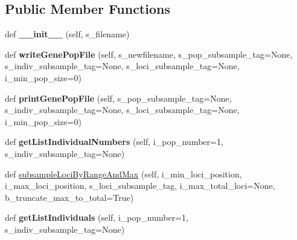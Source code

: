 \subsection*{Public Member Functions}
\begin{DoxyCompactItemize}
\item 
def {\bfseries \+\_\+\+\_\+init\+\_\+\+\_\+} (self, s\+\_\+filename)\hypertarget{classnegui_1_1genepopfilemanager_1_1GenepopFileManager_a8563b3299666d02d45c9acd64f450c51}{}\label{classnegui_1_1genepopfilemanager_1_1GenepopFileManager_a8563b3299666d02d45c9acd64f450c51}

\item 
def {\bfseries write\+Gene\+Pop\+File} (self, s\+\_\+newfilename, s\+\_\+pop\+\_\+subsample\+\_\+tag=None, s\+\_\+indiv\+\_\+subsample\+\_\+tag=None, s\+\_\+loci\+\_\+subsample\+\_\+tag=None, i\+\_\+min\+\_\+pop\+\_\+size=0)\hypertarget{classnegui_1_1genepopfilemanager_1_1GenepopFileManager_a7390cad5840454284e816679a87d84df}{}\label{classnegui_1_1genepopfilemanager_1_1GenepopFileManager_a7390cad5840454284e816679a87d84df}

\item 
def {\bfseries print\+Gene\+Pop\+File} (self, s\+\_\+pop\+\_\+subsample\+\_\+tag=None, s\+\_\+indiv\+\_\+subsample\+\_\+tag=None, s\+\_\+loci\+\_\+subsample\+\_\+tag=None, i\+\_\+min\+\_\+pop\+\_\+size=0)\hypertarget{classnegui_1_1genepopfilemanager_1_1GenepopFileManager_a35aa30c43ab4a5e7762bf8c722314727}{}\label{classnegui_1_1genepopfilemanager_1_1GenepopFileManager_a35aa30c43ab4a5e7762bf8c722314727}

\item 
def {\bfseries get\+List\+Individual\+Numbers} (self, i\+\_\+pop\+\_\+number=1, s\+\_\+indiv\+\_\+subsample\+\_\+tag=None)\hypertarget{classnegui_1_1genepopfilemanager_1_1GenepopFileManager_a652029f0a6e0668e0b75c9683dae0ffd}{}\label{classnegui_1_1genepopfilemanager_1_1GenepopFileManager_a652029f0a6e0668e0b75c9683dae0ffd}

\item 
def \hyperlink{classnegui_1_1genepopfilemanager_1_1GenepopFileManager_a4334a9164415aa05de38ac7b31d59e40}{subsample\+Loci\+By\+Range\+And\+Max} (self, i\+\_\+min\+\_\+loci\+\_\+position, i\+\_\+max\+\_\+loci\+\_\+position, s\+\_\+loci\+\_\+subsample\+\_\+tag, i\+\_\+max\+\_\+total\+\_\+loci=None, b\+\_\+truncate\+\_\+max\+\_\+to\+\_\+total=True)
\item 
def {\bfseries get\+List\+Individuals} (self, i\+\_\+pop\+\_\+number=1, s\+\_\+indiv\+\_\+subsample\+\_\+tag=None)\hypertarget{classnegui_1_1genepopfilemanager_1_1GenepopFileManager_aa6993dde24163002aeae55005437711d}{}\label{classnegui_1_1genepopfilemanager_1_1GenepopFileManager_aa6993dde24163002aeae55005437711d}


\end{DoxyCompactItemize}
